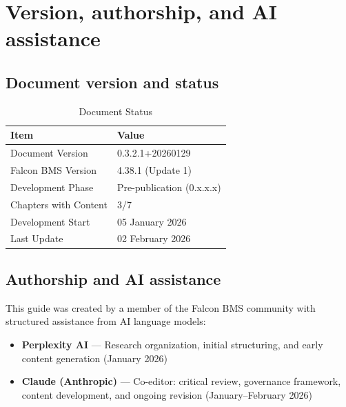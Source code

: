 \documentclass[11pt, a4paper, twoside]{report}
\newcommand{\docversion}{0.3.2.1}
\newcommand{\docbuild}{20260129}
\newcommand{\docstartdate}{05 January 2026}
\newcommand{\docenddate}{02 February 2026}
\newcommand{\chapterscompletedof}{3/7}
\newcommand{\fulldocversion}{\docversion+\docbuild}
\begin{document}
\section{Version, authorship, and AI assistance}
\label{sec:C1-S4}

\subsection{Document version and status}
\label{sec:C1-S4-S1}

\begin{table}[H]
\centering
\caption{Document Status}
\label{tab:C1-doc-status}
\small
\renewcommand{\arraystretch}{1.25}
\begin{tabular}{L{4.5cm} L{9.0cm}}
\toprule
\textbf{Item} & \textbf{Value} \\
\midrule
Document Version & \fulldocversion \\
Falcon BMS Version & 4.38.1 (Update 1) \\
Development Phase & Pre-publication (0.x.x.x) \\
Chapters with Content & \chapterscompletedof \\
Development Start & \docstartdate \\
Last Update & \docenddate \\
\bottomrule
\end{tabular}
\end{table}

\subsection{Authorship and AI assistance}
\label{sec:C1-S4-S2}

This guide was created by a member of the Falcon BMS community with structured assistance from AI language models:

\begin{itemize}
  \item \textbf{Perplexity AI} --- Research organization, initial structuring, and early content generation (January 2026)
  \item \textbf{Claude (Anthropic)} --- Co-editor: critical review, governance framework, content development, and ongoing revision (January--February 2026)
\end{itemize}
\end{document}
